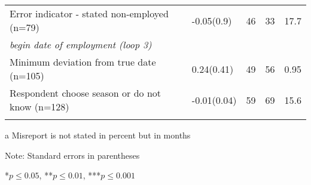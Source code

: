 \begin{threeparttable}[h]
\begin{tabularx}{\textwidth}{@{}Xp{0.1cm}p{1.5cm}p{1cm}p{1cm}p{1.5cm}}
		Error indicator - stated non-employed (n=79)& & -0.05\newline(0.9)&46&33&17.7 \\ \addlinespace \addlinespace
		\textit{begin date of employment (loop 3)}                               								&&&& & \\ \midrule\addlinespace
		Minimum deviation from true date (n=105) &            &0.24\newline (0.41)&49&56&0.95\tnote{a} \\ \addlinespace \addlinespace
		Respondent choose season or do not know (n=128)  &     &-0.01\newline (0.04)&59&69&15.6 \\ \addlinespace      
		\bottomrule                   
	\end{tabularx}
	\begin{tablenotes}
		\begin{footnotesize}
			\item[a] Misreport is not stated in percent but in months
			\item{Note: Standard errors in parentheses}
			\item{*\(p \le 0.05\), **\(p \le 0.01\), ***\(p \le 0.001\)}
		\end{footnotesize}
	\end{tablenotes}
\end{threeparttable}